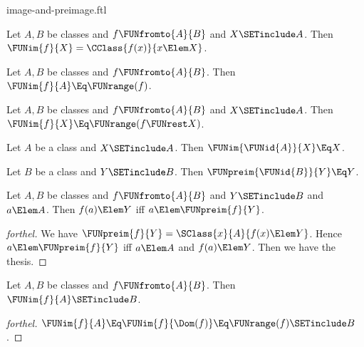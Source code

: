 \documentclass{stex}
\begin{document}
\begin{smodule}{image-and-preimage.ftl}

\begin{proposition}[forthel,id=FOUNDATIONS_07_5919649206108160]
  Let $A, B$ be classes and $f \FUNfromto{A}{B}$ and $X \SETinclude A$.
  Then $\FUNim{f}{X} = \CClass{f(x)}{x \Elem X}$.
\end{proposition}

\begin{corollary}[forthel,id=FOUNDATIONS_07_5543924730953728]
  Let $A, B$ be classes and $f \FUNfromto{A}{B}$.
  Then $\FUNim{f}{A} \Eq \FUNrange(f)$.
\end{corollary}

\begin{corollary}[forthel,id=FOUNDATIONS_07_1818812171157504]
  Let $A, B$ be classes and $f \FUNfromto{A}{B}$ and $X \SETinclude A$.
  Then $\FUNim{f}{X} \Eq \FUNrange(f \FUNrest X)$.
\end{corollary}

\begin{proposition}[forthel,id=FOUNDATIONS_07_911395830890496]
  Let $A$ be a class and $X \SETinclude A$.
  Then $\FUNim{\FUNid{A}}{X} \Eq X$.
\end{proposition}

\begin{proposition}[forthel,id=FOUNDATIONS_07_3349817830932480]
  Let $B$ be a class and $Y \SETinclude B$.
  Then $\FUNpreim{\FUNid{B}}{Y} \Eq Y$.
\end{proposition}

\begin{proposition}[forthel,id=FOUNDATIONS_07_6362984433582080]
  Let $A, B$ be classes and $f \FUNfromto{A}{B}$ and $Y \SETinclude B$ and $a \Elem A$.
  Then $f(a) \Elem Y$ iff $a \Elem \FUNpreim{f}{Y}$.
\end{proposition}
\begin{proof}[forthel]
  We have $\FUNpreim{f}{Y} = \SClass{x}{A}{f(x) \Elem Y}$.
  Hence $a \Elem \FUNpreim{f}{Y}$ iff $a \Elem A$ and $f(a) \Elem Y$.
  Then we have the thesis.
\end{proof}

\begin{proposition}[forthel,id=FOUNDATIONS_07_6730546254184448]
  Let $A, B$ be classes and $f \FUNfromto{A}{B}$.
  Then $\FUNim{f}{A} \SETinclude B$.
\end{proposition}
\begin{proof}[forthel]
  $\FUNim{f}{A}
    \Eq \FUNim{f}{\Dom(f)}
    \Eq \FUNrange(f)
    \SETinclude B$.
\end{proof}


\end{smodule}
\end{document}
